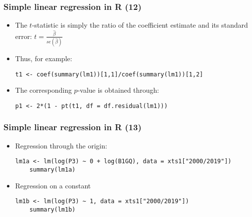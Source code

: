 \documentclass[10pt]{beamer}
\theoremstyle{definition}
\begin{document}
\begin{frame}[fragile]
\frametitle{Simple linear regression in R (12)}
\begin{itemize}
	\item The $t$-statistic is simply the ratio of the coefficient estimate and its standard error: $t = \displaystyle \frac{\widehat{\beta}}{se(\widehat{\beta})}$
	\item Thus, for example:
	\begin{lstlisting}[style = rstyle, breaklines]
	t1 <- coef(summary(lm1))[1,1]/coef(summary(lm1))[1,2]
	\end{lstlisting}
	\item The corresponding $p$-value is obtained through:
	\begin{lstlisting}[style = rstyle, breaklines]
	p1 <- 2*(1 - pt(t1, df = df.residual(lm1)))
	\end{lstlisting}
\end{itemize}
\end{frame}

\begin{frame}[fragile]
\frametitle{Simple linear regression in R (13)}
\begin{itemize}
	\item Regression through the origin:
	\begin{lstlisting}[style = rstyle, breaklines]
	lm1a <- lm(log(P3) ~ 0 + log(B1GQ), data = xts1["2000/2019"])
	summary(lm1a)
	\end{lstlisting}
	\item Regression on a constant
	\begin{lstlisting}[style = rstyle, breaklines]
	lm1b <- lm(log(P3) ~ 1, data = xts1["2000/2019"])
	summary(lm1b)
	\end{lstlisting}
\end{itemize}
\end{frame}
\end{document}
